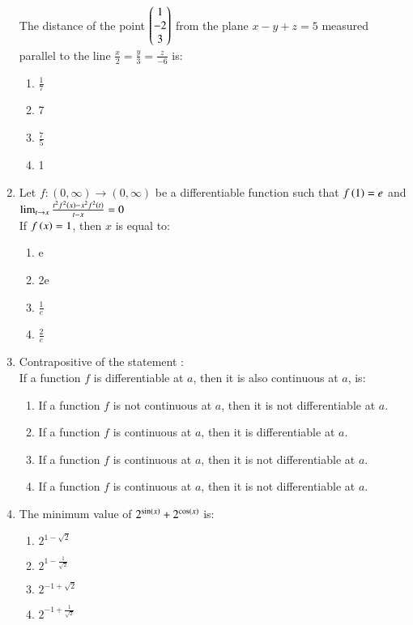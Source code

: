 \documentclass[journal]{IEEEtran}
\begin{document}
\begin{enumerate}
	The distance of the point $\begin{pmatrix}1 \\ -2 \\ 3\end{pmatrix}$ from the plane $x-y+z = 5$ measured parallel to the line $\frac{x}{2} = \frac{y}{3} = \frac{z}{-6}$ is:
		\begin{enumerate}
			\item $\frac{1}{7}$
			\item 7
			\item $\frac{7}{5}$
			\item 1
		\end{enumerate}
	\item
	Let $f: (0, \infty) \to (0, \infty)
$ be a differentiable function such that $f\left(1\right) = e$ and \\
	$\lim_{t \to x} \frac{t^{2}f^{2}\left(x\right)-x^{2}f^{2}\left(t\right)}{t-x} = 0$ \\
	If $f\left(x\right) = 1$, then $x$ is equal to:
		\begin{enumerate}
			\item e
			\item 2e
			\item $\frac{1}{e}$
			\item $\frac{2}{e}$
		\end{enumerate}
	\item
	Contrapositive of the statement : \\
	If a function $f$ is differentiable at $a$, then it is also continuous at $a$, is:
		\begin{enumerate}
			\item If a function $f$ is not continuous at $a$, then it is not differentiable at $a$.
			\item If a function $f$ is continuous at $a$, then it is differentiable at $a$.
			\item If a function $f$ is continuous at $a$, then it is not differentiable at $a$.
			\item If a function $f$ is continuous at $a$, then it is not differentiable at $a$.
		\end{enumerate}
	\item
	The minimum value of $2^{\sin\left(x\right)}+2^{\cos\left(x\right)}$ is:
		\begin{enumerate}
			\item $2^{1-\sqrt{2}}$
			\item $2^{1 - \frac{1}{\sqrt{2}}}$
			\item $2^{-1+\sqrt{2}}$
			\item $2^{-1 + \frac{1}{\sqrt{2}}}$
		\end{enumerate}

\end{enumerate}
\end{document}
